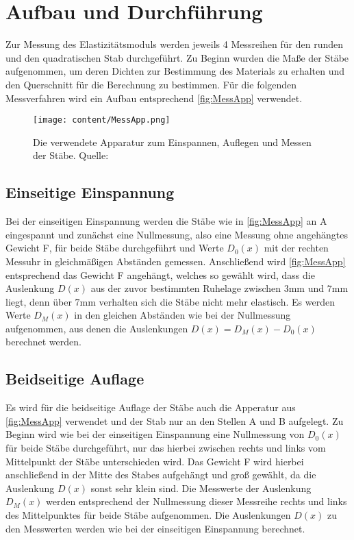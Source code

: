 \section{Aufbau und Durchführung}
\label{sec:Durchführung}
Zur Messung des Elastizitätsmoduls werden jeweils 4 Messreihen für den runden und den quadratischen Stab durchgeführt.
Zu Beginn wurden die Maße der Stäbe aufgenommen, um deren Dichten zur Bestimmung des Materials zu erhalten und den Querschnitt
für die Berechnung zu bestimmen. Für die folgenden Messverfahren wird ein Aufbau entsprechend \autoref{fig:MessApp} verwendet.
\begin{figure}[H]
    \centering
    \texttt{[image: content/MessApp.png]}
    \caption{Die verwendete Apparatur zum Einspannen, Auflegen und Messen der Stäbe. Quelle: \cite{sample}}  %
    \label{fig:MessApp}
\end{figure}
\subsection{Einseitige Einspannung}
\label{subsec:EinseitigeEinspannungAuD}
Bei der einseitigen Einspannung werden die Stäbe wie in \autoref{fig:MessApp} an A eingespannt und zunächst eine Nullmessung, also
eine Messung ohne angehängtes Gewicht F, für beide Stäbe durchgeführt und Werte $D_0(x)$ mit der rechten Messuhr in gleichmäßigen Abständen gemessen.
Anschließend wird \autoref{fig:MessApp} entsprechend das Gewicht F angehängt, welches so gewählt wird, dass die Auslenkung $D(x)$
aus der zuvor bestimmten Ruhelage zwischen $3\unit{\milli\meter}$ und $7\unit{\milli\meter}$
liegt, denn über $7\unit{\milli\meter}$ verhalten sich die Stäbe nicht mehr elastisch. Es werden Werte $D_M(x)$ in den gleichen Abständen wie bei der Nullmessung aufgenommen,
aus denen die Auslenkungen $D(x) = D_M(x) - D_0(x)$ berechnet werden.
\subsection{Beidseitige Auflage}
\label{subsec:BeidseitigeAuflage}
Es wird für die beidseitige Auflage der Stäbe auch die Apperatur aus \autoref{fig:MessApp} verwendet und der Stab nur an den Stellen A und B aufgelegt.
Zu Beginn wird wie bei der einseitigen Einspannung eine Nullmessung von $D_0(x)$ für beide Stäbe durchgeführt, nur das hierbei zwischen rechts und links vom
Mittelpunkt der Stäbe unterschieden wird. Das Gewicht F wird hierbei anschließend in der Mitte des Stabes aufgehängt und groß gewählt, da die Auslenkung $D(x)$
sonst sehr klein sind. Die Messwerte der Auslenkung $D_M(x)$ werden entsprechend der Nullmessung dieser Messreihe rechts und links des Mittelpunktes für beide
Stäbe aufgenommen. Die Auslenkungen $D(x)$ zu den Messwerten werden wie bei der einseitigen Einspannung berechnet.
